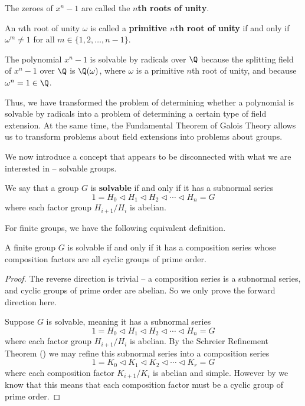 \begin{definition}
    The zeroes of $x^n - 1$ are called the \textbf{$n$th roots of unity}.
\end{definition}

\begin{definition}
    An $n$th root of unity $\omega$ is called a \textbf{primitive $n$th root of unity} if and only if $\omega^m \neq 1$ for all $m \in \{1, 2, \dots, n-1\}$.
\end{definition}

\begin{example}
    The polynomial $x^n - 1$ is solvable by radicals over $\Q$ because the splitting field of $x^n - 1$ over $\Q$ is $\Q(\omega)$, where $\omega$ is a primitive $n$th root of unity, and because $\omega^n = 1 \in \Q$.
\end{example}

Thus, we have transformed the problem of determining whether a polynomial is solvable by radicals into a problem of determining a certain type of field extension. At the same time, the Fundamental Theorem of Galois Theory allows us to transform problems about field extensions into problems about groups.

We now introduce a concept that appears to be disconnected with what we are interested in -- solvable groups.

\begin{definition}
    We say that a group $G$ is \textbf{solvable} if and only if it has a subnormal series
    \[
        1 = H_0 \lhd H_1 \lhd H_2 \lhd \cdots \lhd H_n = G
    \]
    where each factor group $H_{i+1}/H_i$ is abelian.
\end{definition}

For finite groups, we have the following equivalent definition.

\begin{proposition}
    A finite group $G$ is solvable if and only if it has a composition series whose composition factors are all cyclic groups of prime order.
\end{proposition}
\begin{proof}
    The reverse direction is trivial -- a composition series is a subnormal series, and cyclic groups of prime order are abelian. So we only prove the forward direction here.

    Suppose $G$ is solvable, meaning it has a subnormal series
    \[
        1 = H_0 \lhd H_1 \lhd H_2 \lhd \cdots \lhd H_n = G
    \]
    where each factor group $H_{i+1}/H_i$ is abelian. By the Schreier Refinement Theorem () we may refine this subnormal series into a composition series
    \[
        1 = K_0 \lhd K_1 \lhd K_2 \lhd \cdots \lhd K_r = G
    \]
    where each composition factor $K_{i+1}/K_i$ is abelian and simple. However by  we know that this means that each composition factor must be a cyclic group of prime order.
\end{proof}

